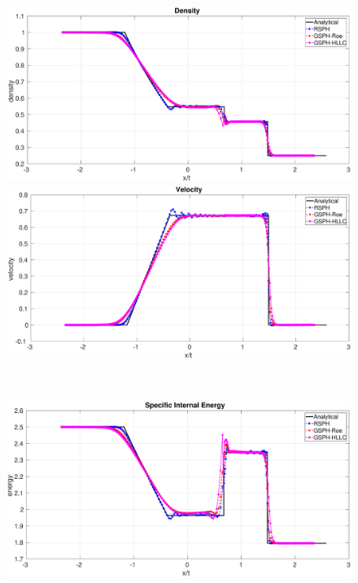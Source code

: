 \documentclass[review]{elsarticle}
\begin{document}
\begin{figure}[H]
    \centering
    \begin{minipage}{.495\textwidth}
        \centering
        \includegraphics[width=0.99 \textwidth]{./Figures/Sod/RCM-Sod-GSPH-compare-rho}
    \end{minipage}%
    \begin{minipage}{.495 \textwidth}
        \centering
        \includegraphics[width=0.99 \textwidth]{./Figures/Sod/RCM-Sod-GSPH-compare-v}
    \end{minipage}%
    \\
    \begin{minipage}{.495\textwidth}
        \centering
        \includegraphics[width=0.99 \textwidth]{./Figures/Sod/RCM-Sod-GSPH-compare-e}

\end{minipage}
\end{figure}
\end{document}
